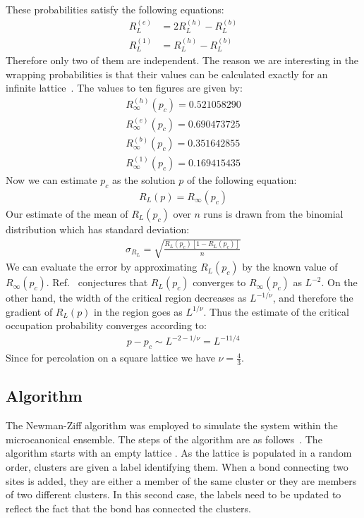 These probabilities satisfy the following equations:
\begin{align}
R_L^{(e)} &= 2R_L^{(h)}-R_L^{(b)}\\
R_L^{(1)} &= R_L^{(h)} -R_L^{(b)}
\end{align}
Therefore only two of them are independent. The reason we are interesting in the wrapping probabilities is that their values can be calculated exactly for an infinite lattice~\cite{Newman_2001}. The values to ten figures are given by:
\begin{align}
R^{(h)}_\infty(p_c) = 0.521058290\\
R^{(e)}_\infty(p_c) = 0.690473725\\
R^{(b)}_\infty(p_c) = 0.351642855\\
R^{(1)}_\infty(p_c) = 0.169415435
\end{align}
Now we can estimate $p_c$ as the solution $p$ of the following equation:
\begin{align}
R_L(p) =  R_\infty(p_c)
\end{align}
Our estimate of the mean of $R_L(p_c)$ over $n$ runs is drawn from the binomial distribution which has standard deviation:
\begin{align}
\sigma_{R_L} =\sqrt{\frac{R_L(p_c)[1-R_L(p_c)]}{n}}
\end{align}
We can evaluate the error by approximating $R_L(p_c)$ by the known value of $R_\infty(p_c)$. 
Ref.~\cite{Newman_2001} conjectures that $R_L(p_c)$ converges to $R_\infty(p_c)$ as $L^{-2}$. On the other hand, the width of the critical region decreases as $L^{-1/\nu}$, and therefore the gradient of $R_L(p)$ in the region goes as $L^{1/\nu}$. Thus the estimate of the critical occupation probability converges according to:
\begin{align}
p-p_c \sim L^{-2-1/\nu} = L^{-11/4}
\end{align}
Since for percolation on a square lattice we have $\nu = \frac 4 3$.

\subsection{Algorithm}

The Newman-Ziff algorithm was employed to simulate the system within the microcanonical ensemble.
The steps of the algorithm are as follows~\cite{Newman_2000}. The algorithm starts with an empty  lattice . As the lattice is populated in a random order, clusters are given a label identifying them. When a bond connecting two sites is added, they are either a member of the same cluster or they are members of two different clusters. In this second case, the labels need to be updated to reflect the fact that the bond has connected the clusters. 

